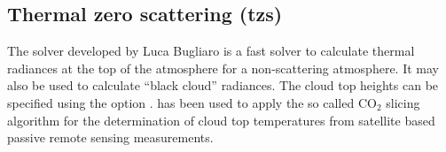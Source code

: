 
\subsection{Thermal zero scattering (tzs)}
The  solver developed by Luca Bugliaro is a fast solver to
calculate thermal radiances at the top of the
atmosphere for a non-scattering atmosphere. It may also be used to
calculate ``black cloud'' radiances. The cloud top heights can be
specified using the option . 
 has been used to apply the so
called CO$_2$ slicing algorithm for the determination of cloud top
temperatures from satellite based passive remote sensing measurements.








